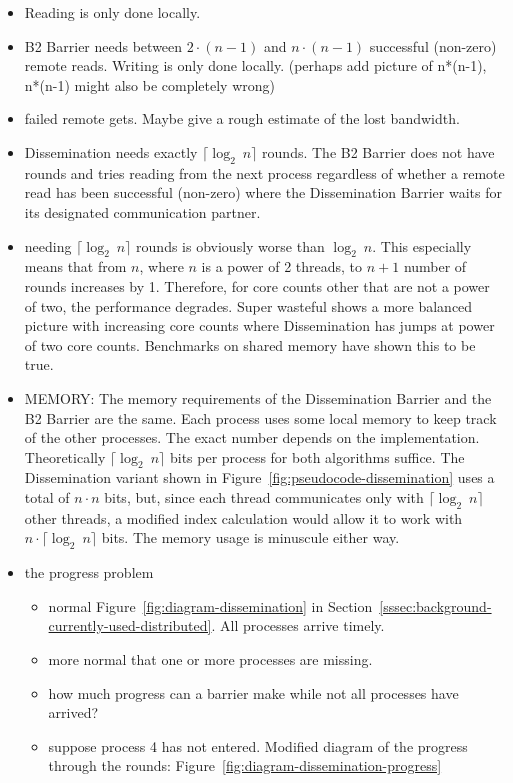 \documentclass[a4paper, 10pt]{article}
\begin{document}
\begin{itemize}
	\item Reading is only done locally.
	\item B2 Barrier needs between $2 \cdot (n-1)$ and $n \cdot (n-1)$ successful (non-zero) remote reads. Writing is only done locally. (perhaps add picture of n*(n-1), n*(n-1) might also be completely wrong)
	\item failed remote gets. Maybe give a rough estimate of the lost bandwidth.
	\item Dissemination needs exactly $\lceil \log _2~n \rceil$ rounds. The B2 Barrier does not have rounds and tries reading from the next process regardless of whether a remote read has been successful (non-zero) where the Dissemination Barrier waits for its designated communication partner.
	\item needing $\lceil \log _2~n \rceil$ rounds is obviously worse than $\log _2~n$. This especially means that from $n$, where $n$ is a power of 2 threads, to $n+1$ number of rounds increases by 1. Therefore, for core counts other that are not a power of two, the performance degrades. Super wasteful shows a more balanced picture with increasing core counts where Dissemination has jumps at power of two core counts. Benchmarks on shared memory have shown this to be true.
	\item MEMORY: The memory requirements of the Dissemination Barrier and the B2 Barrier are the same. Each process uses some local memory to keep track of the other processes. The exact number depends on the implementation. Theoretically $\lceil \log _2~n \rceil$ bits per process for both algorithms suffice. The Dissemination variant shown in Figure~\ref{fig:pseudocode-dissemination} uses a total of $n \cdot n$ bits, but, since each thread communicates only with $\lceil \log _2~n \rceil$ other threads, a modified index calculation would allow it to work with $n \cdot \lceil \log _2 ~n \rceil$ bits. The memory usage is minuscule either way.
	\item the progress problem
		\begin{itemize}
			\item normal Figure~\ref{fig:diagram-dissemination} in Section~\ref{sssec:background-currently-used-distributed}. All processes arrive timely.
			\item more normal that one or more processes are missing.
			\item how much progress can a barrier make while not all processes have arrived?
			\item suppose process 4 has not entered. Modified diagram of the progress through the rounds: Figure~\ref{fig:diagram-dissemination-progress}

\end{itemize}
\end{itemize}
\end{document}
